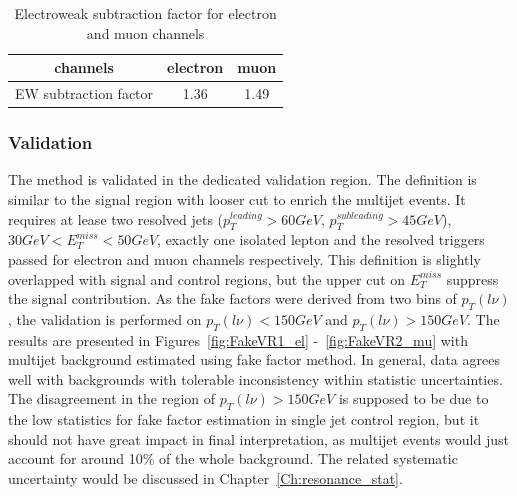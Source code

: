 \begin{table}[h]
  \caption{Electroweak subtraction factor for electron and muon channels} \label{tab:ewsubtraction}
  \begin{center}

    \begin{tabular}{ | c | c | c | }
     \hline
     channels                       &   electron   & muon \\ \hline
     EW subtraction factor          &   1.36       & 1.49 \\ \hline
\end{tabular}
\end{center}
\end{table}

\subsubsection*{Validation}
The method is validated in the dedicated validation region. The definition is similar to the signal region with looser cut to enrich the multijet events. It requires at lease two resolved jets ($p_{T}^{leading}>60GeV$, $p_{T}^{subleading}>45GeV$), $30GeV<E^{miss}_{T}<50GeV$, exactly one isolated lepton and the resolved triggers passed for electron and muon channels respectively. This definition is slightly overlapped with signal and control regions, but the upper cut on $E^{miss}_{T}$ suppress the signal contribution.  As the fake factors were derived from two bins of $p_{T}(l\nu)$, the validation is performed on $p_{T}(l\nu)<150 GeV$ and $p_{T}(l\nu)>150 GeV$. The results are presented in Figures~\ref{fig:FakeVR1_el} -~\ref{fig:FakeVR2_mu} with multijet background estimated using fake factor method. In general, data agrees well with backgrounds with tolerable inconsistency within statistic uncertainties. The disagreement in the region of $p_{T}(l\nu)>150 GeV$ is supposed to be due to the low statistics for fake factor estimation in single jet control region, but it should not have great impact in final interpretation, as multijet events would just account for around 10\% of the whole background. The related systematic uncertainty would be discussed in Chapter~\ref{Ch:resonance_stat}.
\clearpage
